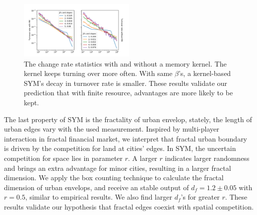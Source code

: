 \documentclass[reprint,unsortedaddress,amsmath,amssymb,aps,prl,showkeys]{revtex4-2}
\begin{document}
\begin{figure}
	\centering
	\includegraphics[width = 0.5\textwidth]{pics/in_one_now_1580064563.85876.pdf}
	\caption{The change rate statistics with and without a memory kernel. The kernel keeps turning over more often. With same $\beta$'s, a kernel-based SYM's decay in turnover rate is smaller. These results validate our prediction that with finite resource, advantages are more likely to be kept.}
	\label{changerate}
\end{figure}

The last property of SYM is the fractality of urban envelop, stately, the length of urban edges vary with the used measurement. Inspired by multi-player interaction in fractal financial market\cite{PhysRevE.65.037106}, we interpret that fractal urban boundary is driven by the competition for land at cities' edges. In SYM, the uncertain competition for space lies in parameter $r$. A larger $r$ indicates larger randomness and brings an extra advantage for minor cities, resulting in a larger fractal dimension. We apply the box counting technique to calculate the fractal dimension of urban envelops, and receive an stable output of $d_f = 1.2\pm 0.05$ with $r = 0.5$, similar to empirical results\cite{batty1992form}. We also find larger $d_f$'s for greater $r$. These results validate our hypothesis that fractal edges coexist with spatial competition. 


\end{document}
